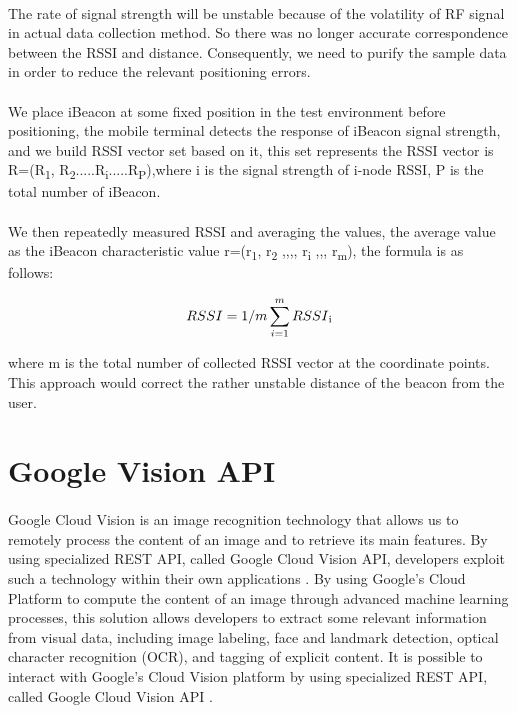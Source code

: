 \documentclass[12pt]{article}
\begin{document}
\paragraph{}The rate of signal strength will be unstable because of the volatility of RF signal in actual data collection method. So there was no longer accurate correspondence between the RSSI and distance. Consequently, we need to purify the sample data in order to reduce the relevant positioning errors.

\paragraph{}We place iBeacon at some fixed position in the test environment before positioning, the mobile terminal detects the response of iBeacon signal strength, and we build RSSI vector set based on it, this set represents the RSSI vector is R=(R\textsubscript{1}, R\textsubscript{2}.....R\textsubscript{i}.....R\textsubscript{P}),where i is the signal strength of i-node RSSI, P is the total number of iBeacon.

\paragraph{}We then repeatedly measured RSSI and averaging the values, the average value as the iBeacon characteristic value r=(r\textsubscript{1}, r\textsubscript{2} ,,,, r\textsubscript{i} ,,, r\textsubscript{m}), the formula is as follows:

\begin{equation}
RSSI = 1/m \sum_{i=1}^m RSSI \textsubscript{i}
\end{equation}

where m is the total number of collected RSSI vector at the coordinate points. This approach would correct the rather unstable distance of the beacon from the user. 

\section{Google Vision API}
\label{vision}
\paragraph{}Google Cloud Vision is an image recognition technology that allows us to remotely process the content of an image and to retrieve its main features. By using specialized REST API, called Google Cloud Vision API, developers exploit such a technology within their own applications \cite{vision}. By using Google’s Cloud Platform to compute the content of an image through advanced machine learning processes, this solution allows developers to extract some relevant information from visual data, including image labeling, face and landmark detection, optical character recognition (OCR), and tagging of explicit content. It is possible to interact with Google’s Cloud Vision platform by using specialized REST API, called Google Cloud Vision API \cite{vision}.
\end{document}
